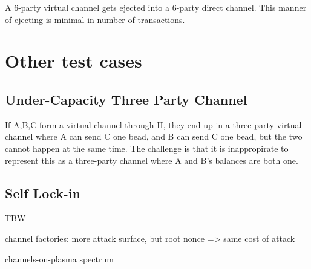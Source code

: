 \documentclass{article}
\begin{document}
\begin{figure}[H]
    \centering
\end{figure}

A 6-party virtual channel gets ejected into a 6-party direct channel. This manner of ejecting is minimal in number of transactions.

\section*{Other test cases}

\subsection*{Under-Capacity Three Party Channel}

\begin{figure}[H]
    \centering
\end{figure}

If A,B,C form a virtual channel through H, they end up in a three-party virtual channel where A can send C one bead, and B can send C one bead, but the two cannot happen at the same time. The challenge is that it is inappropirate to represent this as a three-party channel where A and B's balances are both one.

\subsection*{Self Lock-in}

TBW

channel factories: more attack surface, but root nonce => same cost of attack

channels-on-plasma spectrum
\end{document}
